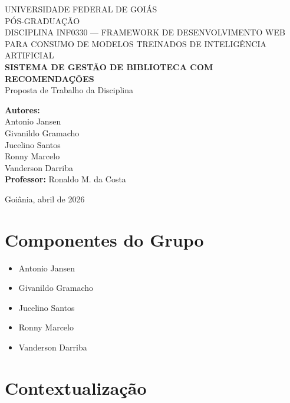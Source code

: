 \begin{titlepage}
\centering
\vspace*{2cm}

{\large UNIVERSIDADE FEDERAL DE GOIÁS}\\[0.3cm]
{\large PÓS-GRADUAÇÃO}\\[0.3cm]
{\large DISCIPLINA INF0330 --- FRAMEWORK DE DESENVOLVIMENTO WEB PARA CONSUMO DE MODELOS TREINADOS DE INTELIGÊNCIA ARTIFICIAL}\\[3cm]

{\Large \textbf{SISTEMA DE GESTÃO DE BIBLIOTECA COM RECOMENDAÇÕES}}\\[0.5cm]
{\large Proposta de Trabalho da Disciplina}\\[3cm]

\begin{flushright}
\begin{minipage}{0.55\textwidth}
\raggedright
\textbf{Autores:}\\
Antonio Jansen\\
Givanildo Gramacho\\
Jucelino Santos\\
Ronny Marcelo\\
Vanderson Darriba\\[0.8cm]

\textbf{Professor:} Ronaldo M. da Costa
\end{minipage}
\end{flushright}

\vfill
{\large Goiânia, abril de 2026}

\end{titlepage}

\section{Componentes do Grupo}

\begin{itemize}
    \item Antonio Jansen
    \item Givanildo Gramacho
    \item Jucelino Santos
    \item Ronny Marcelo
    \item Vanderson Darriba
\end{itemize}

\section{Contextualização}

